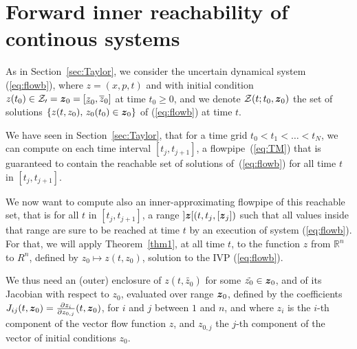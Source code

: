 \documentclass{sig-alternate-05-2015} %
\newcommand\ForAuthors[1]%
 {\par\smallskip                     %
  \begin{center}%
   \fbox%
   {\parbox{0.9\linewidth}%
    {\raggedright\sc--- #1}%
   }%
  \end{center}%
  \par\smallskip                     %
 }
\def\R{{\mathbb R}}
\begin{document}
\section{Forward inner reachability of continous systems}
\label{sec:inner_reachability}

As in Section~\ref{sec:Taylor}, we consider the uncertain dynamical system (\ref{eq:flowb}), where $z=(x,p,t)$ and with initial condition 
$z(t_0) \in {\cal Z_0} = \z_0=[\underline{z}_0,\overline{z}_0]$ at time $t_0 \geq 0$, and we denote ${\cal Z}(t;t_0, \z_0)$
 the set of solutions $\{ z(t,z_0), \, z_0(t_0) \in \z_0 \}$ of  (\ref{eq:flowb}) at time $t$. 

We have seen in  Section~\ref{sec:Taylor}, that for a  time grid $t_0 < t_1 < \ldots < t_N$, we can compute on each time interval  $[t_j,t_{j+1}]$,
a flowpipe~(\ref{eq:TM}) 
that is guaranteed to contain the reachable set of solutions of~(\ref{eq:flowb}) for all time $t$ in $[t_j,t_{j+1}]$. 

We now want to compute also an inner-approximating flowpipe of this reachable set, that is for all $t$ in $[t_j,t_{j+1}]$, 
a range $]\z[(t,t_j,[\z_j])$ such that all values inside that range are sure to be reached at time $t$ by an execution of system (\ref{eq:flowb}).
For that, we will apply Theorem~\ref{thm1}, at all time $t$, to the function $z$ from $\R^n$ to $R^n$, defined by 
$z_0 \mapsto z(t,z_0)$, solution to the IVP (\ref{eq:flowb}). 

We thus need an (outer) enclosure of $z(t,\tilde{z_0})$ for some $\tilde{z_0} \in \z_0$, and of its Jacobian with respect to $z_0$, evaluated over range $\z_0$, 
defined by the coefficients $J_{ij}(t,\z_0)=\frac{\partial z_i}{\partial z_{0,j}}(t,\z_0)$, for $i$ and $j$ between $1$ and $n$, and where $z_i$ is the $i$-th 
component of the vector flow function $z$, and $z_{0,j}$ the $j$-th component of the vector of initial conditions $z_0$. 
\end{document}
